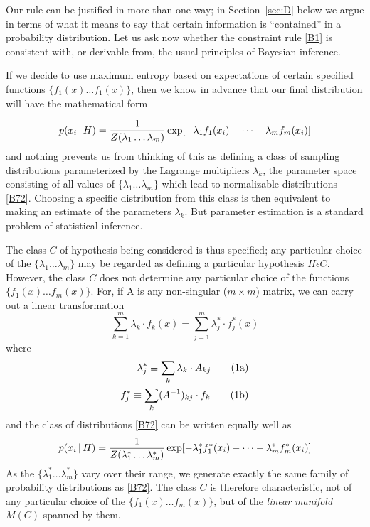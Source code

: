 {Our rule can be justified in more than one way; in Section~\ref{sec:D} below we argue in terms of what it means to say that certain information is ``contained'' in a probability distribution.
Let us ask now whether the constraint rule \eqref{B1} is consistent with, or derivable from, the usual principles of Bayesian inference.

If we decide to use maximum entropy based on expectations of certain specified functions $\{f_1(x)\ldots f_1(x)\}$, then we know in advance that our final distribution will have the mathematical form

\begin{equation}
	\label{B72}
	p(x_i\given H) = \frac{1}{Z(\lambda_1\ldots\lambda_m)} \exp\left[-\lambda_1f_1(x_i) - \cdots - \lambda_mf_m(x_i)\right]
\end{equation}
and nothing prevents us from thinking of this as defining a class of sampling distributions parameterized by the Lagrange multipliers $\lambda_k$, the parameter space consisting of all values of $\{\lambda_1\ldots \lambda_m\}$ which lead to normalizable distributions \eqref{B72}.
Choosing a specific distribution from this class is then equivalent to making an estimate of the parameters $\lambda_k$.
But parameter estimation is a standard problem of statistical inference.

The class $C$ of hypothesis being considered is thus specified; any particular choice of the $\{\lambda_1\ldots \lambda_m\}$ may be regarded as defining a particular hypothesis $H\epsilon C$.
However, the class $C$ does not determine any particular choice of the functions $\{f_1(x) \ldots f_m(x)\}$.
For, if A is any non-singular ($m\times m$) matrix, we can carry out a linear transformation
\begin{equation}
	\label{B73}
	\sum_{k=1}^{m}\lambda_k \cdot f_k(x) = \sum_{j=1}^{m} \lambda^{*}_j\cdot f^{*}_j(x)
\end{equation}
where
\begin{align*}
	\refstepcounter{equation}
	\lambda^{*}_j \equiv \sum_{k} \lambda_k \cdot A_{kj}\tag{\theequation a}\label{B74a}\\
	f^{*}_j \equiv \sum_{k} (A^{-1})_{kj} \cdot f_k \tag{\theequation b}\label{B74b}
\end{align*}
and the class of distributions \eqref{B72} can be written equally well as
\begin{equation}
	\label{B75}
	p(x_i\given H) = \frac{1}{Z(\lambda^{*}_1\ldots\lambda^{*}_m)} \exp\left[-\lambda^{*}_1f^{*}_1(x_i) - \cdots - \lambda^{*}_mf^{*}_m(x_i)\right]
\end{equation}
As the $\{\lambda^{*}_1\ldots \lambda^{*}_m\}$ vary over their range, we generate exactly the same family of probability distributions as \eqref{B72}.
The class $C$ is therefore characteristic, not of any particular choice of the $\{f_1(x) \ldots f_m(x)\}$, but of the \emph{linear manifold} $M(C)$ spanned by them.

}
